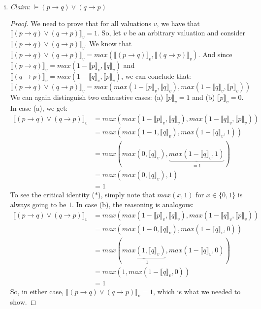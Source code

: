 \begin{enumerate}[\thesection.1]
\begin{enumerate}[(i)]
			\item \emph{Claim}: $\vDash (p\to q)\lor (q\to p)$
			
			\begin{proof}
			We need to prove that for all valuations $v$, we have that $\llbracket (p\to q)\lor (q\to p)\rrbracket_v=1$. So, let $v$ be an arbitrary valuation and consider $\llbracket (p\to q)\lor (q\to p)\rrbracket_v$. We know that $\llbracket (p\to q)\lor (q\to p)\rrbracket_v=max(\llbracket (p\to q)\rrbracket_v, \llbracket (q\to p)\rrbracket_v)$. And since $ \llbracket (p\to q)\rrbracket_v=max(1-\llbracket p\rrbracket_v,\llbracket q\rrbracket_v)$ and $ \llbracket (q\to p)\rrbracket_v=max(1-\llbracket q\rrbracket_v,\llbracket p\rrbracket_v)$, we can conclude that: \[\llbracket (p\to q)\lor (q\to p)\rrbracket_v=max(max(1-\llbracket p\rrbracket_v,\llbracket q\rrbracket_v),max(1-\llbracket q\rrbracket_v,\llbracket p\rrbracket_v))\] 
			We can again distinguish two exhaustive cases: (a) $\llbracket p\rrbracket_v=1$ and (b) $\llbracket p\rrbracket_v=0$. In case (a), we get:
			\begin{align*}
			\llbracket (p\to q)\lor (q\to p)\rrbracket_v&=max(max(1-\llbracket p\rrbracket_v,\llbracket q\rrbracket_v),max(1-\llbracket q\rrbracket_v,\llbracket p\rrbracket_v))\\
			&=max(max(1-1,\llbracket q\rrbracket_v),max(1-\llbracket q\rrbracket_v,1))\\
			&=max(max(0,\llbracket q\rrbracket_v),\underbrace{max(1-\llbracket q\rrbracket_v,1)}_{=1})\tag{$\ast$}\\
			&=max(max(0,\llbracket q\rrbracket_v),1)\\
			&=1
			\end{align*}
			To see the critical identity ($\ast$), simply note that $max(x,1)$ for
			$x\in\{0,1\}$ is always going to be $1$. In case (b), the reasoning is
			analogous:
			\begin{align*}
			\llbracket (p\to q)\lor (q\to p)\rrbracket_v&=max(max(1-\llbracket p\rrbracket_v,\llbracket q\rrbracket_v),max(1-\llbracket q\rrbracket_v,\llbracket p\rrbracket_v))\\
			&=max(max(1-0,\llbracket q\rrbracket_v),max(1-\llbracket q\rrbracket_v,0))\\
			&=max(\underbrace{max(1,\llbracket q\rrbracket_v)}_{=1},max(1-\llbracket q\rrbracket_v,0))\\
			&=max(1,max(1-\llbracket q\rrbracket_v,0))\\
			&=1
			\end{align*}
	So, in either case, $\llbracket (p\to q)\lor (q\to p)\rrbracket_v=1$, which is what we needed to show.

\end{proof}
\end{enumerate}
\end{enumerate}
